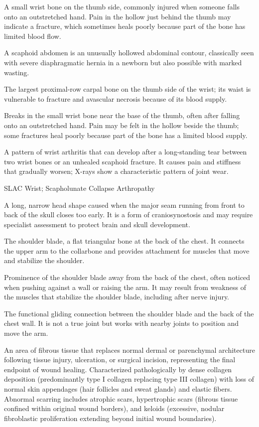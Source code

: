  A small wrist bone on the thumb side, commonly injured when someone falls onto an outstretched hand. Pain in the hollow just behind the thumb may indicate a fracture, which sometimes heals poorly because part of the bone has limited blood flow.

 A scaphoid abdomen is an unusually hollowed abdominal contour, classically seen with severe diaphragmatic hernia in a newborn but also possible with marked wasting.

 The largest proximal-row carpal bone on the thumb side of the wrist; its waist is vulnerable to fracture and avascular necrosis because of its blood supply.

 Breaks in the small wrist bone near the base of the thumb, often after falling onto an outstretched hand. Pain may be felt in the hollow beside the thumb; some fractures heal poorly because part of the bone has a limited blood supply.

 A pattern of wrist arthritis that can develop after a long-standing tear between two wrist bones or an unhealed scaphoid fracture. It causes pain and stiffness that gradually worsen; X-rays show a characteristic pattern of joint wear.

\synonyms
SLAC Wrist; Scapholunate Collapse Arthropathy

 A long, narrow head shape caused when the major seam running from front to back of the skull closes too early. It is a form of craniosynostosis and may require specialist assessment to protect brain and skull development.

 The shoulder blade, a flat triangular bone at the back of the chest. It connects the upper arm to the collarbone and provides attachment for muscles that move and stabilize the shoulder.

 Prominence of the shoulder blade away from the back of the chest, often noticed when pushing against a wall or raising the arm. It may result from weakness of the muscles that stabilize the shoulder blade, including after nerve injury.

 The functional gliding connection between the shoulder blade and the back of the chest wall. It is not a true joint but works with nearby joints to position and move the arm.

 An area of fibrous tissue that replaces normal dermal or parenchymal architecture following tissue injury, ulceration, or surgical incision, representing the final endpoint of wound healing. Characterized pathologically by dense collagen deposition (predominantly type I collagen replacing type III collagen) with loss of normal skin appendages (hair follicles and sweat glands) and elastic fibers. Abnormal scarring includes atrophic scars, hypertrophic scars (fibrous tissue confined within original wound borders), and keloids (excessive, nodular fibroblastic proliferation extending beyond initial wound boundaries).

